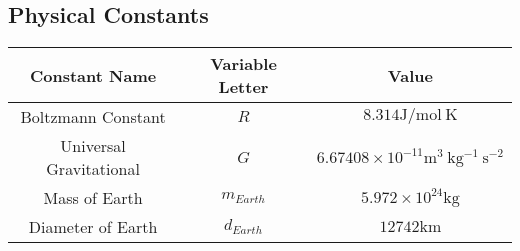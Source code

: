 \subsection{Physical Constants} \label{app:Physical Constants}
	\begin{table}[h!]
		\centering
		\begin{tabular}{|c|c|c|}
			\hline
			\textbf{Constant Name} & \textbf{Variable Letter} & \textbf{Value} \\ \hline
			Boltzmann Constant & $R$ & $8.314 \si{\joule / \mole~\kelvin}$ \\ \hline
			Universal Gravitational & $G$ & $6.67408 \times 10^{-11} \si{\meter^{3}~\kilogram^{-1}~\second^{-2}}$ \\ \hline
			Mass of Earth & $m_{Earth}$ & $5.972 \times 10^{24} \si{\kilogram}$ \\ \hline
			Diameter of Earth & $d_{Earth}$ & $12742 \si{\kilo\meter}$ \\ \hline
		\end{tabular}
	\end{table}